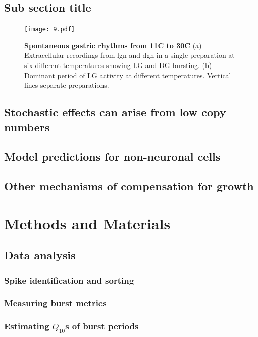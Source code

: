 \documentclass[9pt,lineno]{elife}
\begin{document}
\subsection{Sub section title}

\lipsum[2]


\begin{figure}
\begin{fullwidth}
\texttt{[image: 9.pdf]}

\caption{\textbf{Spontaneous gastric rhythms from 11C to 30C} (a) Extracellular recordings from lgn and dgn in a single preparation at six different temperatures showing LG and DG bursting. (b)  Dominant period of LG activity at different temperatures. Vertical lines separate preparations.  } 
\label{fig:9}
\end{fullwidth}
\end{figure}

\subsection{Stochastic effects can arise from low copy numbers}

\lipsum[3]

\subsection{Model predictions for non-neuronal cells}

\lipsum[2]

\subsection{Other mechanisms of compensation for growth}

\lipsum[5-6]




\section{Methods and Materials}

\subsection*{Data analysis}

\subsubsection*{Spike identification and sorting}

\subsubsection*{Measuring burst metrics}

\subsubsection*{Estimating $Q_{10}$s of burst periods}




\appendix
\end{document}
